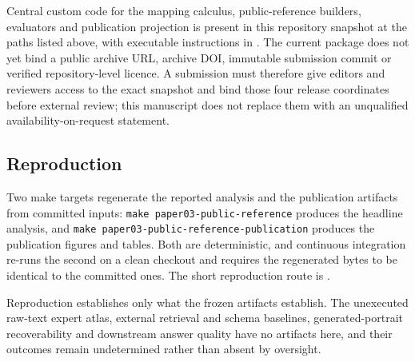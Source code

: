Central custom code for the mapping calculus, public-reference builders,
evaluators and publication projection is present in this repository snapshot
at the paths listed above, with executable instructions in .
The current package does not yet bind a public archive URL, archive DOI,
immutable submission commit or verified repository-level licence. A submission
must therefore give editors and reviewers access to the exact snapshot and bind
those four release coordinates before external review; this manuscript does
not replace them with an unqualified availability-on-request statement.

\subsection{Reproduction}

Two make targets regenerate the reported analysis and the publication
artifacts from committed inputs: \texttt{make paper03-public-reference}
produces the headline analysis, and \texttt{make
paper03-public-reference-publication} produces the publication figures and
tables. Both are deterministic, and continuous integration re-runs the second
on a clean checkout and requires the regenerated bytes to be identical to the
committed ones. The short reproduction route is .

Reproduction establishes only what the frozen artifacts establish. The
unexecuted raw-text expert atlas, external retrieval and schema baselines,
generated-portrait recoverability and downstream answer quality have no
artifacts here, and their outcomes remain undetermined rather than absent by
oversight.

\endinput
